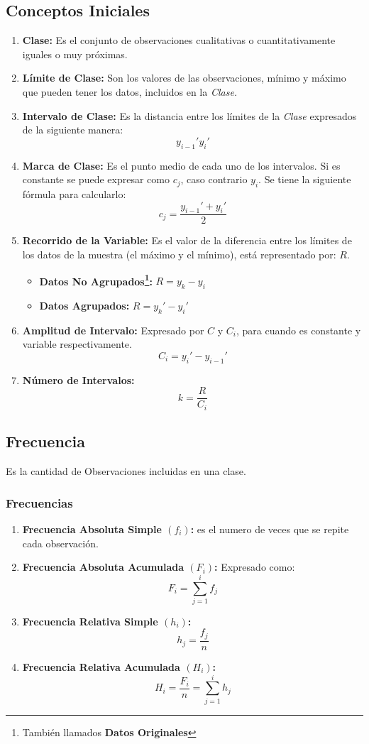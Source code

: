 \subsection{Conceptos Iniciales}
\begin{enumerate}[label=(\roman*)]
\item \textbf{Clase:} Es el conjunto de observaciones cualitativas o cuantitativamente iguales o muy próximas.
\item \textbf{Límite de Clase:} Son los valores de las observaciones, mínimo y máximo que pueden tener los datos, incluidos en la \textit{Clase.}
\item \textbf{Intervalo de Clase:} Es la distancia entre los límites de la \textit{Clase} expresados de la siguiente manera:
$$y_{i-1}'  y_i'$$
\item \textbf{Marca de Clase:} Es el punto medio de cada uno de los intervalos. Si es constante se puede expresar como $c_j$, caso contrario $y_i$. Se tiene la siguiente fórmula para calcularlo:
$$c_j = \dfrac{y_{i-1}'+y_i'}{2}$$
\item \textbf{Recorrido de la Variable:} Es el valor de la diferencia entre los límites de los datos de la muestra (el máximo y el mínimo), está representado por: $R$.
\begin{itemize}
\item \textbf{Datos No Agrupados\footnote{También llamados \textbf{Datos Originales}}:} $R=y_k-y_i$
\item \textbf{Datos Agrupados:} $R=y_k'-y_i'$
\end{itemize}
\item \textbf{Amplitud de Intervalo:} Expresado por $C$ y $C_i$, para cuando es constante y variable respectivamente.
$$C_i = y_i' - y_{i-1}'$$
\item \textbf{Número de Intervalos:} $$k=\dfrac{R}{C_i}$$
\end{enumerate}
\subsection{Frecuencia}
Es la cantidad de Observaciones incluidas en una clase.
\subsubsection{Frecuencias}
\begin{enumerate}[label=(\roman*)]
\item \textbf{Frecuencia Absoluta Simple $(f_i)$:} es el numero de veces que se repite cada observación.
\item \textbf{Frecuencia Absoluta Acumulada $(F_i)$:} Expresado como:
$$F_i = \sum_{j=1}^{i}f_j$$
\item \textbf{Frecuencia Relativa Simple $(h_i)$:} $$h_j=\dfrac{f_j}{n}$$
\item \textbf{Frecuencia Relativa Acumulada $(H_i)$:} $$H_i=\dfrac{F_i}{n}=\sum_{j=1}^{i}h_j$$
\end{enumerate}

